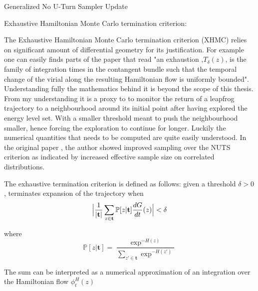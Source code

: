 \documentclass[]{report}
\begin{document}
\begin{algorithm}
{{	
	\;
}
    }
\caption{Generalized No U-Turn Sampler Update}
\end{algorithm}


Exhaustive Hamiltonian Monte Carlo termination criterion:

The Exhaustive Hamiltonian Monte Carlo termination criterion (XHMC) relies on significant amount of differential geometry for its justification. For example one can easily finds parts of the paper that read "an exhaustion ,$T_{\delta}(z)$, is the family of integration times in the contangent bundle such that the temporal change of the virial along the resulting Hamiltonian flow is uniformly bounded". Understanding fully the mathematics behind it is beyond the scope of this thesis. From my understanding it is a proxy to to monitor the return of a leapfrog trajectory to a neighbourhood around its initial point after having explored the energy level set. With a smaller threshold meant to push the neighbourhood smaller, hence forcing the exploration to continue for longer. Luckily the numerical quantities that needs to be computed are quite easily understood. In the original paper \cite{betancourt2016identifying}, the author showed improved sampling over the NUTS criterion as indicated by increased effective sample size on correlated distributions. 

The exhaustive termination criterion is defined as follows: given a threshold $\delta > 0$, terminates expansion of the trajectory when 
\[  \Bigl |\frac{1}{|\mathbf{t}|} \sum_{z \in \mathbf{t}} \mathbb{P}[z | \mathbf{t}] \frac{dG}{dt}(z) \Bigr | < \delta \]

where 
\[ \mathbb{P}[z| \mathbf{t}] = \frac{\exp^{-H(z)}}{\sum_{z' \in \mathbf{t}} \exp^{-H(z')}} \]

The sum can be interpreted as a numerical approximation of an integration over the Hamiltonian flow $\phi_{t}^H(z)$
\end{document}
